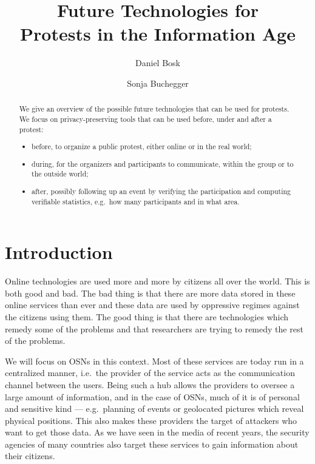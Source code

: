 \documentclass[a4paper]{llncs}
\title{%
  Future Technologies for\\
  Protests in the Information Age
}
\author{%
  Daniel Bosk
  \and
  Sonja Buchegger
}
\institute{%
  School of Computer Science and Communication,\\
  KTH Royal Institute of Technology,
  Stockholm\\
  \email{\{dbosk,buc\}@kth.se}
}
\begin{document}
\maketitle

\begin{abstract}
  We give an overview of the possible future technologies that can be used for 
  protests.
  We focus on privacy-preserving tools that can be used before, under and after 
  a protest:
  \begin{itemize}
    \item before, to organize a public protest, either online or in the real 
      world;
    \item during, for the organizers and participants to communicate, within 
      the group or to the outside world;
    \item after, possibly following up an event by verifying the participation 
      and computing verifiable statistics, e.g.\ how many participants and in 
      what area.
  \end{itemize}

\end{abstract}


\section{Introduction}
\label{Introduction}

Online technologies are used more and more by citizens all over the world.
This is both good and bad.
The bad thing is that there are more data stored in these online services than 
ever and these data are used by oppressive regimes against the citizens using 
them.
The good thing is that there are technologies which remedy some of the problems 
and that researchers are trying to remedy the rest of the problems.

We will focus on \acp{OSN} in this context.
Most of these services are today run in a centralized manner, i.e.\ the 
provider of the service acts as the communication channel between the users.
Being such a hub allows the providers to oversee a large amount of information, 
and in the case of \acp{OSN}, much of it is of personal and sensitive kind ---  
e.g.\ planning of events or geolocated pictures which reveal physical 
positions.
This also makes these providers the target of attackers who want to get those 
data.
As we have seen in the media of recent years, the security agencies of many 
countries also target these services to gain information about their citizens.
\end{document}
